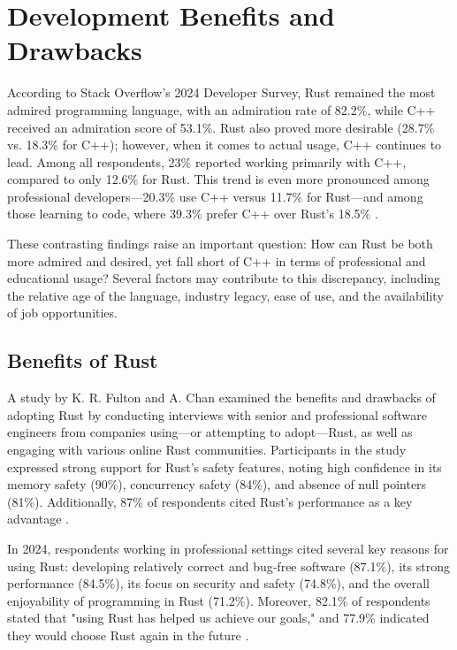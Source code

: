 \chapter{Development Benefits and Drawbacks}
\label{chap:development}

According to Stack Overflow’s 2024 Developer Survey, Rust remained the most admired programming language, with an admiration rate of 82.2\%, while C++ received an admiration score of 53.1\%. Rust also proved more desirable (28.7\% vs. 18.3\% for C++); however, when it comes to actual usage, C++ continues to lead. Among all respondents, 23\% reported working primarily with C++, compared to only 12.6\% for Rust. This trend is even more pronounced among professional developers—20.3\% use C++ versus 11.7\% for Rust—and among those learning to code, where 39.3\% prefer C++ over Rust’s 18.5\% \cite[]{Technology2024Stack}. 

These contrasting findings raise an important question: How can Rust be both more admired and desired, yet fall short of C++ in terms of professional and educational usage? Several factors may contribute to this discrepancy, including the relative age of the language, industry legacy, ease of use, and the availability of job opportunities.

\section{Benefits of Rust}
A study by K. R. Fulton and A. Chan \cite[]{fultonBenefitsDrawbacksAdopting} examined the benefits and drawbacks of adopting Rust by conducting interviews with senior and professional software engineers from companies using—or attempting to adopt—Rust, as well as engaging with various online Rust communities. Participants in the study expressed strong support for Rust’s safety features, noting high confidence in its memory safety (90\%), concurrency safety (84\%), and absence of null pointers (81\%). Additionally, 87\% of respondents cited Rust’s performance as a key advantage \cite[]{fultonBenefitsDrawbacksAdopting}.

In 2024, respondents working in professional settings cited several key reasons for using Rust: developing relatively correct and bug‐free software (87.1\%), its strong performance (84.5\%), its focus on security and safety (74.8\%), and the overall enjoyability of programming in Rust (71.2\%). Moreover, 82.1\% of respondents stated that "using Rust has helped us achieve our goals," and 77.9\% indicated they would choose Rust again in the future \cite{2024StateRust}.


